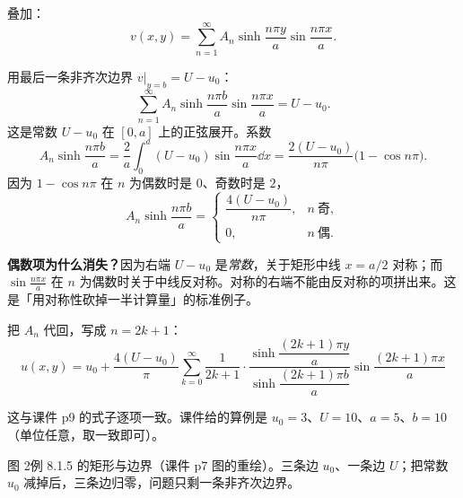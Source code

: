 叠加：
\begin{equation}
  v(x,y)=\sum_{n=1}^{\infty}A_n\sinh\frac{n\pi y}{a}\sin\frac{n\pi x}{a}.
\end{equation}


用最后一条非齐次边界 $v\big|_{y=b}=U-u_0$：
\begin{equation}
  \sum_{n=1}^{\infty}A_n\sinh\frac{n\pi b}{a}\sin\frac{n\pi x}{a}=U-u_0 .
\end{equation}
这是常数 $U-u_0$ 在 $[0,a]$ 上的正弦展开。系数
\begin{equation}
  A_n\sinh\frac{n\pi b}{a}=\frac{2}{a}\int_0^a(U-u_0)\sin\frac{n\pi x}{a}\dd x
  =\frac{2(U-u_0)}{n\pi}\big(1-\cos n\pi\big).
\end{equation}
因为 $1-\cos n\pi$ 在 $n$ 为偶数时是 $0$、奇数时是 $2$，
\begin{equation}
  A_n\sinh\frac{n\pi b}{a}=
  \begin{cases}
    \dfrac{4(U-u_0)}{n\pi}, & n\ \text{奇},\\[6pt]
    0, & n\ \text{偶}.
  \end{cases}
\end{equation}

\textbf{偶数项为什么消失？}因为右端 $U-u_0$ 是\emph{常数}，关于矩形中线 $x=a/2$ 对称；而 $\sin\frac{n\pi x}{a}$ 在 $n$ 为偶数时关于中线反对称。对称的右端不能由反对称的项拼出来。这是「用对称性砍掉一半计算量」的标准例子。


把 $A_n$ 代回，写成 $n=2k+1$：
\begin{equation}
  \boxed{\;
  u(x,y)=u_0+\frac{4(U-u_0)}{\pi}\sum_{k=0}^{\infty}\frac{1}{2k+1}\cdot
  \frac{\sinh\dfrac{(2k+1)\pi y}{a}}{\sinh\dfrac{(2k+1)\pi b}{a}}
  \sin\dfrac{(2k+1)\pi x}{a}\;}
\end{equation}

这与课件 p9 的式子逐项一致。课件给的算例是 $u_0=3$、$U=10$、$a=5$、$b=10$（单位任意，取一致即可）。

\begin{figbox}

\small 图 2\quad 例 8.1.5 的矩形与边界（课件 p7 图的重绘）。三条边 $u_0$、一条边 $U$；把常数 $u_0$ 减掉后，三条边归零，问题只剩一条非齐次边界。
\end{figbox}

